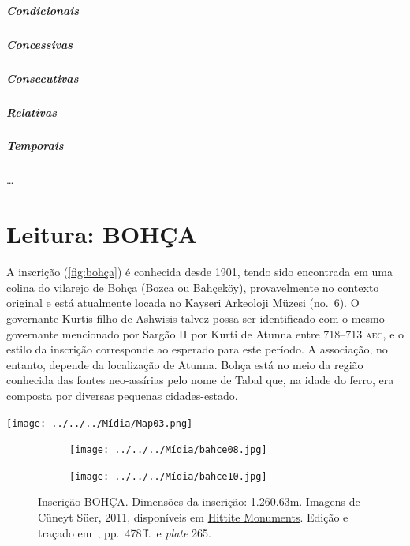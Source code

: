 \paragraph{Condicionais}

\paragraph{Concessivas}

\paragraph{Consecutivas}

\paragraph{Relativas}

\paragraph{Temporais}
\ldots{}

\clearpage
\chapter{Leitura: BOHÇA}


A inscrição (\autoref{fig:bohça}) é conhecida desde 1901, tendo sido encontrada
em uma colina do vilarejo de Bohça (Bozca ou Bahçeköy),
provavelmente no contexto original e está atualmente locada no Kayseri
Arkeoloji Müzesi (no.\ 6).
O governante Kurtis filho de Ashwisis talvez possa ser identificado com o
mesmo governante mencionado por Sargão II por Kurti de Atunna entre 718--713
\textsc{aec}, e o estilo da inscrição corresponde ao esperado para este
período.
A associação, no entanto, depende da localização de Atunna.
Bohça está no meio da região conhecida das fontes
neo-assírias pelo nome de Tabal que, na idade do ferro, era composta por
diversas pequenas cidades-estado.

\begin{center}
	\texttt{[image: ../../../Mídia/Map03.png]}
\end{center}


\begin{figure}[h]
	\centering
	\begin{subfigure}{0.49\textwidth}
		\texttt{[image: ../../../Mídia/bahce08.jpg]}
	\end{subfigure}
	\hfill
	\begin{subfigure}{0.49\textwidth}
		\texttt{[image: ../../../Mídia/bahce10.jpg]}
	\end{subfigure}
	\caption[BOHÇA]{Inscrição BOHÇA. Dimensões da inscrição:
		1.26\times0.63m.
		Imagens de Cüneyt Süer, 2011,
		disponíveis em
		\href{https://www.hittitemonuments.com/bahcekoy/}{Hittite Monuments}.
		Edição e traçado em~, pp.\ 478ff.\ e \emph{plate}
		265.
	}\label{fig:bohça}
\end{figure}


